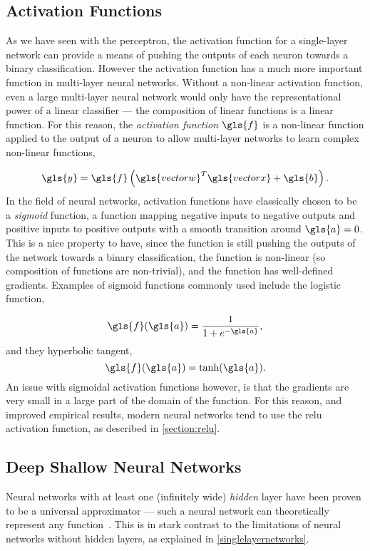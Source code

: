\documentclass[thesis]{subfiles}
\begin{document}
\subsection{Activation Functions}\label{activationfunctions}
As we have seen with the perceptron, the activation function for a single-layer network can provide a means of pushing the outputs of each neuron towards a binary classification. However the activation function has a much more important function in multi-layer neural networks. Without a non-linear activation function, even a large multi-layer neural network would only have the representational power of a linear classifier --- the composition of linear functions is a linear function. For this reason, the \emph{activation function} $\gls{f}$ is a non-linear function applied to the output of a neuron to allow multi-layer networks to learn complex non-linear functions,

\begin{equation}
\gls{y} = \gls{f}\left(\gls{vectorw}^T\gls{vectorx} + \gls{b}\right).
\end{equation}
%
In the field of neural networks, activation functions have classically chosen to be a \emph{sigmoid} function, \ie a function mapping negative inputs to negative outputs and positive inputs to positive outputs with a smooth transition around $\gls{a} = 0$. This is a nice property to have, since the function is still pushing the outputs of the network towards a binary classification, the function is non-linear (so composition of functions are non-trivial), and the function has well-defined gradients. Examples of sigmoid functions commonly used include the logistic function, 

\begin{equation}
	\gls{f}(\gls{a}) = \frac{1}{1+e^{-\gls{a}}},
\end{equation}
%
and they hyperbolic tangent,
\begin{equation}
	\gls{f}(\gls{a}) = \tanh(\gls{a}).
\end{equation}
%
An issue with sigmoidal activation functions however, is that the gradients are very small in a large part of the domain of the function. For this reason, and improved empirical results, modern neural networks tend to use the \gls{relu} activation function, as described in \cref{section:relu}.


\subsection{Deep \Vs Shallow Neural Networks}
Neural networks with at least one (infinitely wide) \emph{hidden} layer have been proven to be a universal approximator --- \ie such a neural network can theoretically represent any function~\citep{journals/mcss/Cybenko92,hornik89a}. This is in stark contrast to the limitations of neural networks without hidden layers, as explained in \cref{singlelayernetworks}.
\end{document}
